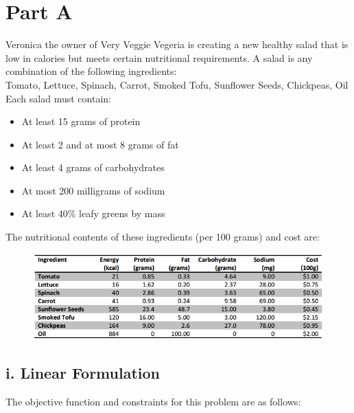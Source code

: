 \documentclass[11pt]{scrreprt}
\begin{document}
\section{Part A}
Veronica the owner of Very Veggie Vegeria is creating a new 
healthy salad that is low in calories but meets certain 
nutritional requirements. A salad is any combination of the 
following ingredients:\\

Tomato, Lettuce, Spinach, Carrot, Smoked Tofu, Sunflower Seeds, Chickpeas,
Oil\\

Each salad must contain:

\begin{itemize}
	\item At least 15 grams of protein
	\item At least 2 and at most 8 grams of fat
	\item At least 4 grams of carbohydrates
	\item At most 200 milligrams of sodium
	\item At least 40\% leafy greens by mass
\end{itemize}

The nutritional contents of these ingredients (per 100 grams)
and cost are:

\begin{figure}[!htbp]
	\includegraphics[width=1.0\textwidth]{nutritional.png}
\end{figure}

\subsection{i. Linear Formulation}
The objective function and constraints for this problem are as 
follows:
\end{document}

